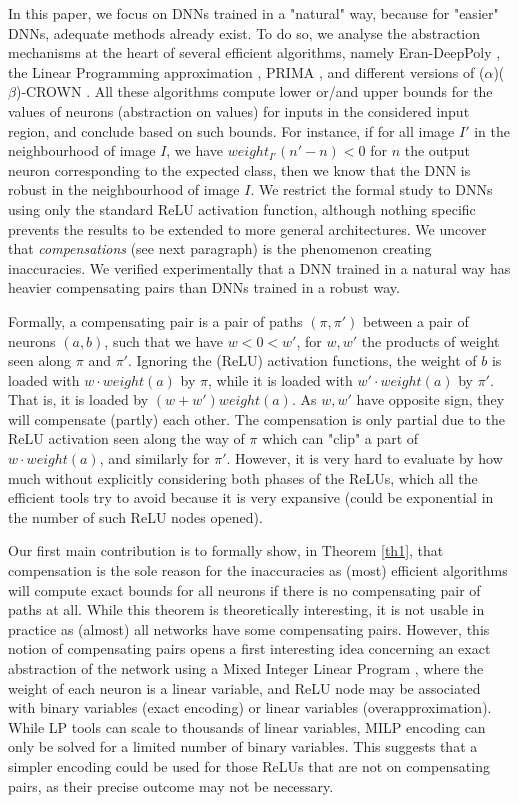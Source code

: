 In this paper, we focus on DNNs trained in a "natural" way,
because for "easier" DNNs, adequate methods already exist. 
To do so, we analyse the abstraction mechanisms at the heart of several efficient algorithms, namely Eran-DeepPoly \cite{deeppoly}, the Linear Programming approximation \cite{MILP}, PRIMA \cite{prima}, and different versions of ($\alpha$)($\beta$)-CROWN \cite{crown}. All these algorithms compute lower or/and upper bounds for the values of neurons (abstraction on values) for inputs in the considered input region, and conclude based on such bounds. For instance, if for all image $I'$ in the neighbourhood of image $I$, we have $weight_{I'}(n'-n) < 0$ for $n$ the output neuron corresponding to the expected class, then we know that the DNN is robust in the neighbourhood of image $I$. We restrict the formal study to DNNs using only the standard ReLU activation function, although nothing specific prevents the results to be extended to more general architectures. We uncover that {\em compensations} 
(see next paragraph) is the phenomenon creating inaccuracies. We verified experimentally that a DNN trained in a natural way has heavier compensating pairs than DNNs trained in a robust way.

Formally, a compensating pair is a pair of paths $(\pi,\pi')$ between a pair of neurons $(a,b)$, such that we have $w < 0 < w'$, for $w,w'$ the products of weight seen along $\pi$ and $\pi'$. Ignoring the (ReLU) activation functions, the weight of $b$ is loaded with $w \cdot weight(a)$ by $\pi$, while it is loaded with $w' \cdot weight(a)$ by $\pi'$. That is, it is loaded by $(w+w') weight(a)$. As $w,w'$ have opposite sign, they will compensate (partly) each other. The compensation is only partial due to the ReLU activation seen along the way of $\pi$ which can "clip" a part of $w \cdot weight(a)$, and similarly for $\pi'$. However, it is very hard to evaluate by how much without explicitly considering both phases of the ReLUs, which all the efficient tools try to avoid because it is very expansive (could be exponential in the number of such ReLU nodes opened).

Our first main contribution is to formally show, in Theorem \ref{th1}, that compensation is the sole reason for the inaccuracies as (most) efficient algorithms will compute exact bounds for all neurons if there is no compensating pair of paths at all.
While this theorem is theoretically interesting, it is not usable in practice as (almost) all networks have some compensating pairs. However, this notion of compensating pairs opens a first interesting idea concerning an exact abstraction of the network using a Mixed Integer Linear Program \cite{MILP}, where the weight of each neuron is a linear variable, and ReLU node may be associated with binary variables (exact encoding) or linear variables (overapproximation). While LP tools can scale to thousands of linear variables, MILP encoding can only be solved for a limited number of binary variables. This suggests that a simpler encoding could be used for those ReLUs that are not on compensating pairs, as their precise outcome may not be necessary.

